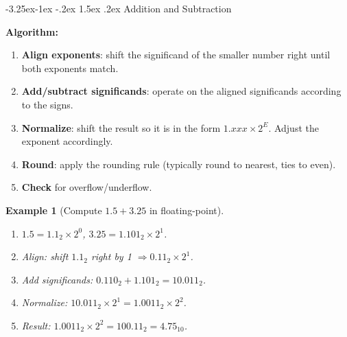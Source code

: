 \documentclass{article}
\makeatletter
\newtheorem{example}{Example}[section]
\theoremstyle{remark}
\newlength{\subsecindent}
\renewcommand\subsection{\@startsection{subsection}{2}{\subsecindent}%
  {-3.25ex\@plus -1ex \@minus -.2ex}%
  {1.5ex \@plus .2ex}%
  {\normalfont\large\bfseries}}
\newenvironment{sub}{%
  \begin{list}{}{%
    \setlength{\leftmargin}{4em}%
    \setlength{\rightmargin}{0pt}%
    \setlength{\topsep}{0pt}%
    \setlength{\partopsep}{0pt}%
    \setlength{\parsep}{\parskip}%
    \setlength{\itemsep}{\parskip}%
  }\item\relax
}{\end{list}}
\makeatother
\begin{document}
\subsection{Addition and Subtraction}
\begin{sub}
\textbf{Algorithm:}
\begin{enumerate}
  \item \textbf{Align exponents}: shift the significand of the smaller number
        right until both exponents match.
  \item \textbf{Add/subtract significands}: operate on the aligned significands
        according to the signs.
  \item \textbf{Normalize}: shift the result so it is in the form
        $1.xxx \times 2^E$.  Adjust the exponent accordingly.
  \item \textbf{Round}: apply the rounding rule (typically round to nearest,
        ties to even).
  \item \textbf{Check} for overflow/underflow.
\end{enumerate}

\begin{example}[Compute $1.5 + 3.25$ in floating-point]
\leavevmode
\begin{enumerate}
  \item $1.5 = 1.1_2 \times 2^{0}$, \quad $3.25 = 1.101_2 \times 2^{1}$.
  \item Align: shift $1.1_2$ right by 1 $\Rightarrow 0.11_2 \times 2^{1}$.
  \item Add significands: $0.110_2 + 1.101_2 = 10.011_2$.
  \item Normalize: $10.011_2 \times 2^{1} = 1.0011_2 \times 2^{2}$.
  \item Result: $1.0011_2 \times 2^{2} = 100.11_2 = 4.75_{10}$. \checkmark
\end{enumerate}
\end{example}
\end{sub}
\end{document}
